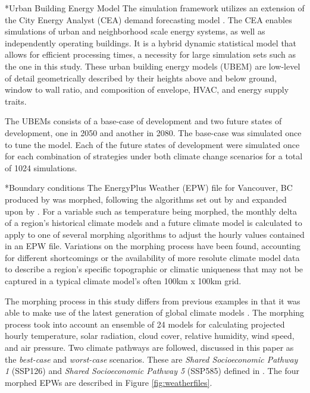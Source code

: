 \documentclass[twocolumn, a4paper,10pt]{article}
\makeatletter
\renewcommand\subsection{\@startsection{subsection}{1}{\z@}{\z@}{\z@}{\normalfont\normalsize\bfseries}}
\renewcommand\subsection{\@startsection{subsection}{1}{\z@}{\z@}{0.1pt}{\normalfont\normalsize\bfseries}}
\makeatother
\begin{document}
\subsection*{Urban Building Energy Model}
The simulation framework utilizes an extension of the City Energy Analyst (CEA) demand forecasting model \citep{fonseca_integrated_2015,fonseca_city_2016,the_cea_team_city_2020}. The CEA enables simulations of urban and neighborhood scale energy systems, as well as independently operating buildings. It is a hybrid dynamic statistical model that allows for efficient processing times, a necessity for large simulation sets such as the one in this study. These urban building energy models (UBEM) are low-level of detail geometrically described by their heights above and below ground, window to wall ratio, and composition of envelope, HVAC, and energy supply traits. 

The UBEMs consists of a base-case of development and two future states of development, one in 2050 and another in 2080. The base-case was simulated once to tune the model. Each of the future states of development were simulated once for each combination of strategies under both climate change scenarios for a total of 1024 simulations.  

\subsection*{Boundary conditions}
The EnergyPlus Weather (EPW) file for Vancouver, BC produced by \citet{cwec_2016} was morphed, following the algorithms set out by \citet{belcher_constructing_2005} and expanded upon by \citet{jentsch_climate_2008}. For a variable such as temperature being morphed, the monthly delta of a region's historical climate models and a future climate model is calculated to apply to one of several morphing algorithms to adjust the hourly values contained in an EPW file. Variations on the morphing process have been found, accounting for different shortcomings or the availability of more resolute climate model data to describe a region's specific topographic or climatic uniqueness that may not be captured in a typical climate model's often 100km x 100km grid.

The morphing process in this study differs from previous examples in that it was able to make use of the latest generation of global climate models \citep{oneill_scenario_2016}. The morphing process took into account an ensemble of 24 models for calculating projected hourly temperature, solar radiation, cloud cover, relative humidity, wind speed, and air pressure. Two climate pathways are followed, discussed in this paper as the \textit{best-case} and \textit{worst-case} scenarios. These are \textit{Shared Socioeconomic Pathway 1} (SSP126) and \textit{Shared Socioeconomic Pathway 5} (SSP585)
defined in \citet{oneill_roads_2017}. The four morphed EPWs are described in Figure \ref{fig:weatherfiles}.
\end{document}
